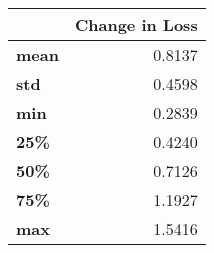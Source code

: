 \begin{tabular}{lr}
\toprule
{} &  Change in Loss \\
\midrule
\textbf{mean} &          0.8137 \\
\textbf{std } &          0.4598 \\
\textbf{min } &          0.2839 \\
\textbf{25\% } &          0.4240 \\
\textbf{50\% } &          0.7126 \\
\textbf{75\% } &          1.1927 \\
\textbf{max } &          1.5416 \\
\bottomrule
\end{tabular}

